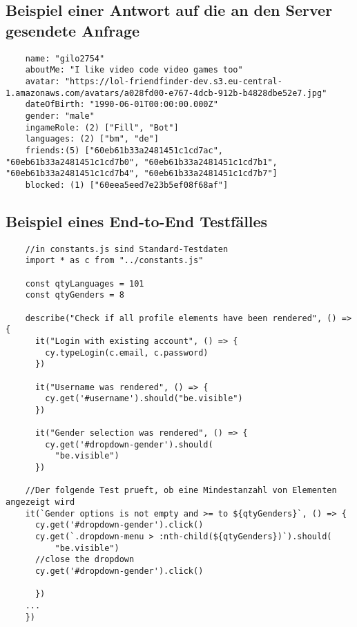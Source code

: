 
\subsection{Beispiel einer Antwort auf die an den Server gesendete Anfrage }\label{subsec_UabsAnhang}
\begin{lstlisting}
    name: "gilo2754"
    aboutMe: "I like video code video games too"
    avatar: "https://lol-friendfinder-dev.s3.eu-central-1.amazonaws.com/avatars/a028fd00-e767-4dcb-912b-b4828dbe52e7.jpg"
    dateOfBirth: "1990-06-01T00:00:00.000Z"
    gender: "male"
    ingameRole: (2) ["Fill", "Bot"]
    languages: (2) ["bm", "de"]
    friends:(5) ["60eb61b33a2481451c1cd7ac", "60eb61b33a2481451c1cd7b0", "60eb61b33a2481451c1cd7b1", "60eb61b33a2481451c1cd7b4", "60eb61b33a2481451c1cd7b7"]
    blocked: (1) ["60eea5eed7e23b5ef08f68af"]
\end{lstlisting}


\subsection{Beispiel eines End-to-End Testfälles}\label{subsec_UabsAnhang}
\begin{lstlisting}
    //in constants.js sind Standard-Testdaten
    import * as c from "../constants.js"
    
    const qtyLanguages = 101
    const qtyGenders = 8
    
    describe("Check if all profile elements have been rendered", () => {
      it("Login with existing account", () => {
        cy.typeLogin(c.email, c.password)
      })
    
      it("Username was rendered", () => {
        cy.get('#username').should("be.visible")
      })
    
      it("Gender selection was rendered", () => {
        cy.get('#dropdown-gender').should(
          "be.visible")
      })
    
    //Der folgende Test prueft, ob eine Mindestanzahl von Elementen angezeigt wird  
    it(`Gender options is not empty and >= to ${qtyGenders}`, () => {
      cy.get('#dropdown-gender').click()
      cy.get(`.dropdown-menu > :nth-child(${qtyGenders})`).should(
          "be.visible")
      //close the dropdown
      cy.get('#dropdown-gender').click()
    
      })
    ...
    })
    
    \end{lstlisting}
